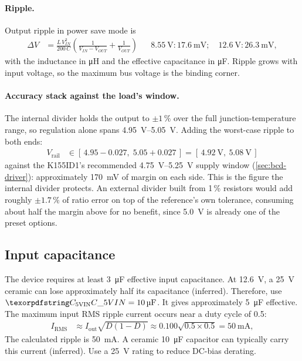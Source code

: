 \paragraph{Ripple.} Output ripple in power save mode is
\begin{align*}
  \Delta V &= \frac{L\,V_{IN}^2}{200\,C}
    \left(\frac{1}{V_{IN}-V_{OUT}}+\frac{1}{V_{OUT}}\right)
  &&\SI{8.55}{\volt}: \SI{17.6}{\milli\volt}; \quad
    \SI{12.6}{\volt}: \SI{26.3}{\milli\volt},
\end{align*}
with the inductance in \si{\micro\henry} and the effective capacitance in
\si{\micro\farad}. Ripple grows with input voltage, so the maximum bus voltage is
the binding corner.

\paragraph{Accuracy stack against the load's window.} The internal divider holds
the output to $\pm1\,\%$ over the full junction-temperature range, so regulation
alone spans \SIrange{4.95}{5.05}{\volt}. Adding the worst-case ripple to both
ends:
\begin{align*}
  V_{\mathrm{rail}} &\in [\,4.95-0.027,\; 5.05+0.027\,]
    = [\,\SI{4.92}{\volt},\ \SI{5.08}{\volt}\,]
\end{align*}
against the K155ID1's recommended \SIrange{4.75}{5.25}{\volt} supply window
(\cref{sec:bcd-driver}): approximately \SI{170}{\milli\volt} of margin on each
side. This is the figure the internal divider protects. An external divider built
from 1\,\% resistors would add roughly $\pm1.7\,\%$ of ratio error on top of the
reference's own tolerance, consuming about half the margin above for no
benefit, since \SI{5.0}{\volt} is already one of the preset options.

\subsection{Input capacitance}\label{sec:5v-cin}

The device requires at least \SI{3}{\micro\farad} effective input capacitance.
At \SI{12.6}{\volt}, a \SI{25}{\volt} ceramic can lose approximately half its
capacitance (inferred). Therefore, use
$\des{C}{5VIN} = \SI{10}{\micro\farad}$. It gives approximately
\SI{5}{\micro\farad} effective. The maximum input RMS ripple current occurs
near a duty cycle of 0.5:
\begin{align*}
  I_{\mathrm{RMS}} &\approx I_{\mathrm{out}}\sqrt{D(1-D)}
    \approx 0.100\sqrt{0.5 \times 0.5} = \SI{50}{\milli\ampere},
\end{align*}
The calculated ripple is \SI{50}{\milli\ampere}. A ceramic
\SI{10}{\micro\farad} capacitor can typically carry this current (inferred).
Use a \SI{25}{\volt} rating to reduce DC-bias derating.

